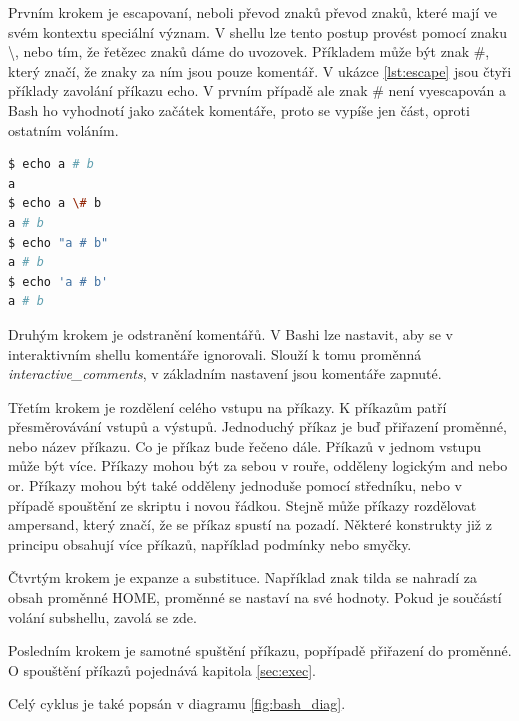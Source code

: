 \documentclass[thesis=M,czech]{FITthesis}[2012/06/26]
\begin{document}
Prvním krokem je escapovaní, neboli převod znaků převod znaků, které mají ve svém kontextu speciální význam. V shellu lze tento postup provést pomocí znaku \textbackslash, nebo tím, že řetězec znaků dáme do uvozovek. Příkladem může být znak \#, který značí, že znaky za ním jsou pouze komentář. V ukázce \ref{lst:escape} jsou čtyři příklady zavolání příkazu echo. V prvním případě ale znak \# není vyescapován a Bash ho vyhodnotí jako začátek komentáře, proto se vypíše jen část, oproti ostatním voláním.

\begin{minipage}{\linewidth}
\begin{lstlisting}[language=bash, caption={Escapovaní v shellu}, label={lst:escape}]
$ echo a # b
a
$ echo a \# b
a # b
$ echo "a # b"
a # b
$ echo 'a # b'
a # b
\end{lstlisting}
\end{minipage}

Druhým krokem je odstranění komentářů. V Bashi lze nastavit, aby se v interaktivním shellu komentáře ignorovali. Slouží k tomu proměnná \textit{interactive\_comments}, v základním nastavení jsou komentáře zapnuté.

Třetím krokem je rozdělení celého vstupu na příkazy. K příkazům patří přesměrovávání vstupů a výstupů. Jednoduchý příkaz je buď přiřazení proměnné, nebo název příkazu. Co je příkaz bude řečeno dále. Příkazů v jednom vstupu může být více. Příkazy mohou být za sebou v rouře, odděleny logickým and nebo or. Příkazy mohou být také odděleny jednoduše pomocí středníku, nebo v případě spouštění ze skriptu i novou řádkou. Stejně může příkazy rozdělovat ampersand, který značí,  že se příkaz spustí na pozadí. Některé konstrukty již z principu obsahují více příkazů, například podmínky nebo smyčky.

Čtvrtým krokem je expanze a substituce. Například znak tilda se nahradí za obsah proměnné HOME, proměnné se nastaví na své hodnoty. Pokud je součástí volání subshellu, zavolá se zde.

Posledním  krokem je samotné spuštění příkazu, popřípadě přiřazení do proměnné. O spouštění příkazů pojednává kapitola \ref{sec:exec}.

Celý cyklus je také popsán v diagramu \ref{fig:bash_diag}.
\end{document}
